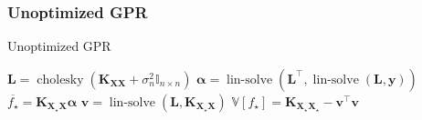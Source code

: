 \documentclass[9pt,hyperref={pdfpagelabels=false},xcolor=table]{beamer}
\begin{document}
\begin{frame}
    \frametitle{Unoptimized GPR}
    {\centering
        \begin{minipage}{.9\linewidth}
            \begin{algorithm}[H]
                \caption{Unoptimized GPR}
                \SetAlgoLined
                \DontPrintSemicolon

                \BlankLine
                $\bm{L} = \operatorname{cholesky} \left( \bm{K_{XX}} + \sigma_n^2 \mathbb{I}_{n \times n} \right)$\;
                $\bm{\alpha} = \operatorname{lin-solve} \left( \bm{L}^{\intercal} , \operatorname{lin-solve} \left( \bm{L}, \bm{y} \right) \right)$\;
                $\overline{f_{\star}} = \bm{K_{X_{\star} X}} \bm{\alpha}$\;
                $\bm{v} = \operatorname{lin-solve} \left( \bm{L}, \bm{K_{X_{\star} X}} \right)$\;
                $\mathbb{V} \left[ f_{\star} \right] = \bm{K_{X_{\star} X_{\star}}} - \bm{v}^{\intercal} \bm{v}$\;
                \BlankLine
            \end{algorithm}
        \end{minipage}
        \par
    }
\end{frame}
\end{document}
